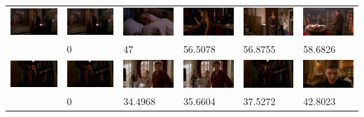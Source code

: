 \documentclass[10pt,a4paper]{article}
\begin{document}
\begin{table}
\begin{tabular}{|l|l|l|l|l|l|}
	\includegraphics[width=20mm]{queries/046990.jpg} &	
	\includegraphics[width=20mm]{queries/046990.jpg}  & 
	\includegraphics[width=20mm]{queries/012325.jpg}  &
	\includegraphics[width=20mm]{queries/032368.jpg}  &
	\includegraphics[width=20mm]{queries/012194.jpg} &
	\includegraphics[width=20mm]{queries/015662.jpg} \\ 
	~ & 0 & 47 & 56.5078 & 56.8755 & 58.6826 \\ \hline

	\includegraphics[width=20mm]{queries/032326.jpg} &	
	\includegraphics[width=20mm]{queries/032326.jpg}  & 
	\includegraphics[width=20mm]{queries/012195.jpg}  &
	\includegraphics[width=20mm]{queries/012324.jpg}  &
	\includegraphics[width=20mm]{queries/032367.jpg} &
	\includegraphics[width=20mm]{queries/052268.jpg} \\ 
	~ & 0 & 34.4968 & 35.6604 & 37.5272 & 42.8023 \\ \hline

        \hline
    \end{tabular}
\end{table}
\end{document}
